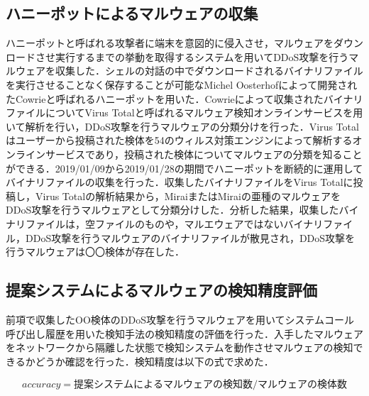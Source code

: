 \subsection{ハニーポットによるマルウェアの収集}
ハニーポットと呼ばれる攻撃者に端末を意図的に侵入させ，マルウェアをダウンロードさせ実行するまでの挙動を取得するシステムを用いてDDoS攻撃を行うマルウェアを収集した．シェルの対話の中でダウンロードされるバイナリファイルを実行させることなく保存することが可能なMichel Oosterhofによって開発されたCowrieと呼ばれるハニーポットを用いた．Cowrieによって収集されたバイナリファイルについてVirus Totalと呼ばれるマルウェア検知オンラインサービスを用いて解析を行い，DDoS攻撃を行うマルウェアの分類分けを行った．Virus Totalはユーザーから投稿された検体を54のウィルス対策エンジンによって解析するオンラインサービスであり，投稿された検体についてマルウェアの分類を知ることができる．2019/01/09から2019/01/28の期間でハニーポットを断続的に運用してバイナリファイルの収集を行った．収集したバイナリファイルをVirus Totalに投稿し，Virus Totalの解析結果から，MiraiまたはMiraiの亜種のマルウェアをDDoS攻撃を行うマルウェアとして分類分けした．分析した結果，収集したバイナリファイルは，空ファイルのものや，マルエウェアではないバイナリファイル，DDoS攻撃を行うマルウェアのバイナリファイルが散見され，DDoS攻撃を行うマルウェアは〇〇検体が存在した．

\subsection{提案システムによるマルウェアの検知精度評価}
前項で収集したOO検体のDDoS攻撃を行うマルウェアを用いてシステムコール呼び出し履歴を用いた検知手法の検知精度の評価を行った．入手したマルウェアをネットワークから隔離した状態で検知システムを動作させマルウェアの検知できるかどうか確認を行った．検知精度は以下の式で求めた．

\begin{equation}
    accuracy = 提案システムによるマルウェアの検知数/マルウェアの検体数
\end{equation}